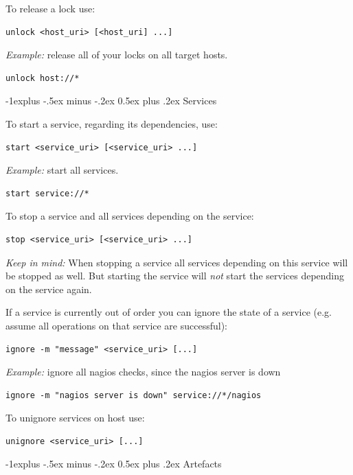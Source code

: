 \documentclass[10pt,landscape]{article}
\makeatletter
\renewcommand{\subsection}{\@startsection{subsection}{2}{0mm}%
                                {-1explus -.5ex minus -.2ex}%
                                {0.5ex plus .2ex}%
                                {\normalfont\normalsize\bfseries}}
\makeatother
\begin{document}
\begin{multicols}{3}
To release a lock use:
\begin{lstlisting}
unlock <host_uri> [<host_uri] ...]
\end{lstlisting}

\emph{Example:} release all of your locks on all target hosts.
\begin{lstlisting}
unlock host://*
\end{lstlisting}



\vfill\columnbreak
\subsection{Services}

To start a service, regarding its dependencies, use:
\begin{lstlisting}
start <service_uri> [<service_uri> ...]
\end{lstlisting}

\emph{Example:} start all services.
\begin{lstlisting}
start service://*
\end{lstlisting}

To stop a service and all services depending on the service:
\begin{lstlisting}
stop <service_uri> [<service_uri> ...]
\end{lstlisting}

\emph{Keep in mind:} When stopping a service all services depending on this service will be
stopped as well. But starting the service will \emph{not} start the services
depending on the service again.


If a service is currently out of order you can ignore the state of a service
(e.g. assume all operations on that service are successful):
\begin{lstlisting}
ignore -m "message" <service_uri> [...]
\end{lstlisting}

\emph{Example:} ignore all nagios checks, since the nagios server is down
\begin{lstlisting}
ignore -m "nagios server is down" service://*/nagios
\end{lstlisting}

To unignore services on host use:
\begin{lstlisting}
unignore <service_uri> [...]
\end{lstlisting}



\vfill\columnbreak
\subsection{Artefacts}


\end{multicols}
\end{document}
